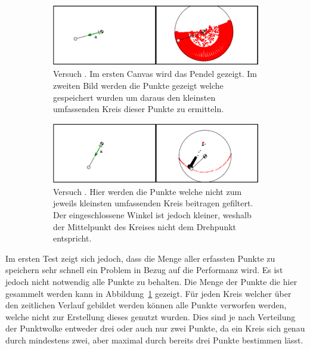 \begin{figure}
    \centering
    \begin{subfigure}[t]{0.45\textwidth}
        \includegraphics[width=\textwidth]{gfx/pendel1_1.png}
        \caption{Versuch . Im ersten Canvas wird das Pendel gezeigt. Im zweiten Bild werden die Punkte gezeigt welche gespeichert wurden um daraus den kleinsten umfassenden Kreis dieser Punkte zu ermitteln.}\label{fig:pendel1_1}
    \end{subfigure}
    \begin{subfigure}[t]{0.45\textwidth}
        \includegraphics[width=\textwidth]{gfx/pendel1_2.png}
        \caption{Versuch . Hier werden die Punkte welche nicht zum jeweils kleinsten umfassenden Kreis beitragen gefiltert. Der eingeschlossene Winkel ist jedoch kleiner, weshalb der Mittelpunkt des Kreises nicht dem Drehpunkt entspricht.}\label{fig:pendel1_2}
    \end{subfigure}
    \caption[Versuche  und ]{}
    \label{fig:pendel1_1_2}
\end{figure}

Im ersten Test zeigt sich jedoch, dass die Menge aller erfassten Punkte zu speichern sehr schnell ein Problem in Bezug auf die Performanz wird.
Es ist jedoch nicht notwendig alle Punkte zu behalten.
Die Menge der Punkte die hier gesammelt werden kann in Abbildung~\ref{fig:pendel1_1} gezeigt.
Für jeden Kreis welcher über den zeitlichen Verlauf gebildet werden können alle Punkte verworfen werden, welche nicht zur Erstellung dieses genutzt wurden.
Dies sind je nach Verteilung der Punktwolke entweder drei oder auch nur zwei Punkte, da ein Kreis sich genau durch mindestens zwei, aber maximal durch bereits drei Punkte bestimmen lässt.

